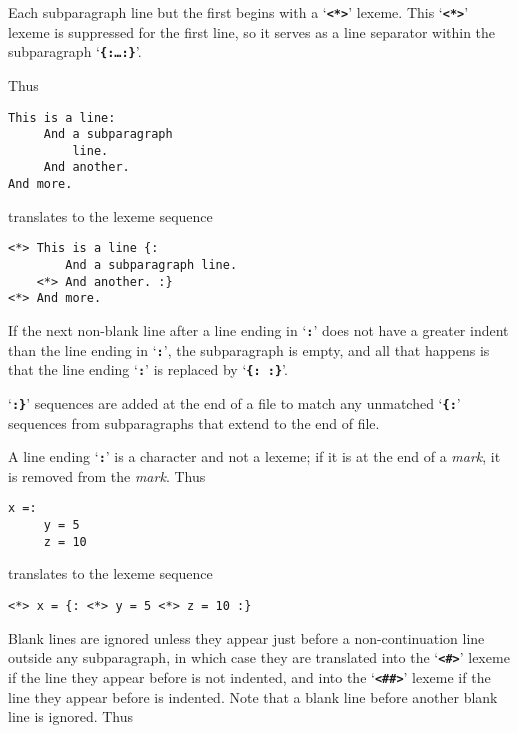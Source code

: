 \documentclass[12pt]{article}
\makeatletter
\newcommand{\TT}[1]{{\tt \bfseries #1}}
\newcommand{\ttkey}[1]{\TT{#1}\index{#1@{\tt #1}}}
\newenvironment{indpar}[1][0.3in]%
	{\begin{list}{}%
		     {\setlength{\itemsep}{0in}%
		      \setlength{\topsep}{0in}%
		      \setlength{\parsep}{1ex}%
		      \setlength{\labelwidth}{#1}%
		      \setlength{\leftmargin}{#1}%
		      \addtolength{\leftmargin}{\labelsep}}%
	 \item}%
	{\end{list}}
\makeatother
\begin{document}
Each subparagraph line but the first begins with a `\TT{<*>}'
lexeme.  This `\TT{<*>}' lexeme is suppressed for the first
line, so it serves as a line separator within
the subparagraph `\TT{\{:\ldots:\}}'.


Thus

\begin{indpar}\begin{verbatim}
This is a line:
     And a subparagraph
         line.
     And another.
And more.
\end{verbatim}\end{indpar}

translates to the lexeme sequence

\begin{indpar}\begin{verbatim}
<*> This is a line {:
        And a subparagraph line.
    <*> And another. :}
<*> And more.
\end{verbatim}\end{indpar}

If the next non-blank line after a line ending in `\TT{:}' does
not have a greater indent than the line ending in `\TT{:}', the
subparagraph is empty, and all that happens is that the line
ending `\TT{:}' is replaced by `\TT{\{:~:\}}'.

`\TT{:\}}' sequences are added at the end of a file to
match any unmatched `\TT{\{:}' sequences from subparagraphs
that extend to the end of file.

A line ending `\TT{:}' is a character and not a lexeme; if it
is at the end of a {\em mark}, it is removed from the {\em mark}.
Thus

\begin{indpar}\begin{verbatim}
x =:
     y = 5
     z = 10
\end{verbatim}\end{indpar}

translates to the lexeme sequence

\begin{indpar}\begin{verbatim}
<*> x = {: <*> y = 5 <*> z = 10 :}
\end{verbatim}\end{indpar}

Blank lines are ignored unless they appear just before a non-continuation
line outside any subparagraph,
in which case they are translated into the `\ttkey{<\#>}' lexeme if
the line they appear before is not indented, and into the
`\ttkey{<\#\#>}' lexeme if the line they appear before is indented.
Note that a blank line before another blank line is ignored.  Thus
\end{document}
